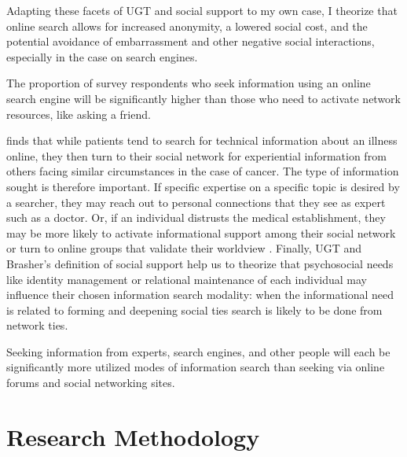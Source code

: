 Adapting these facets of UGT and social support to my own case, I theorize that
online search allows for increased anonymity, a lowered social cost, and the
potential avoidance of embarrassment and other negative social interactions,
especially in the case on search engines.

\begin{hyp} \label{hyp:online-vs-network}
The proportion of survey respondents who seek information
using an online search engine will be significantly higher than those who
need to activate network resources, like asking a friend.
\end{hyp}


\citet{rainsCopingIllnessDigitally2018} finds that while patients tend to search for
technical information about an illness online, they then turn to their social
network for experiential information from others facing similar circumstances in
the case of cancer. The type of information sought is therefore important. If
specific expertise on a specific topic is desired by a searcher, they may reach
out to personal connections that they see as expert such as a doctor. Or, if an
individual distrusts the medical establishment, they may be more likely to
activate informational support among their social network or turn to online
groups that validate their worldview \citep{bogersHowSocialAre2014}. Finally,
UGT and Brasher's definition of social support
\citeyearpar{brashersInformationSeekingAvoiding2002} help us to theorize that
psychosocial needs like identity management or relational maintenance of each
individual may influence their chosen information search modality: when the
informational need is related to forming and deepening social ties search is
likely to be done from network ties.

\begin{hyp} \label{hyp:drgooglefriend}
Seeking information from experts, search engines, and other people
will each be significantly more utilized modes of information search than seeking via 
online forums and social networking sites. 
\end{hyp}

\hypertarget{research-methodology}{\section{Research Methodology}\label{research-methodology}}

